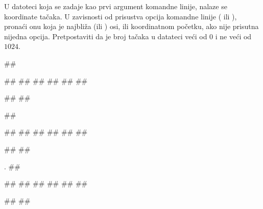 \begin{Answer}[ref=404]
\end{Answer}
\begin{Exercise}[label=405]
  U datoteci koja se zadaje kao prvi argument komandne linije, nalaze
  se koordinate tačaka. U zavisnosti od prisustva opcija komandne
  linije ( ili ), pronaći onu koja je najbliža
   (ili ) osi, ili koordinatnom početku, ako nije
  prisutna nijedna opcija. Pretpostaviti da je broj tačaka u datateci
  veći od $0$ i ne veći od $1024$.
  
\begin{minitest}
\begin{test}{1}
##

##
##
##
##
##
##

#\naslovIzlaz#
##
\end{test}
\end{minitest}
\begin{minitest}
\begin{test}{2}
##
  
##
##
##
##
##
##

#\naslovIzlaz#
##
\end{test}
\end{minitest}
\begin{minitest}
\begin{test}{3}.
##

##
##
##
##
##
##
  
#\naslovIzlaz#
##
\end{test}
\end{minitest}


\end{Exercise}

